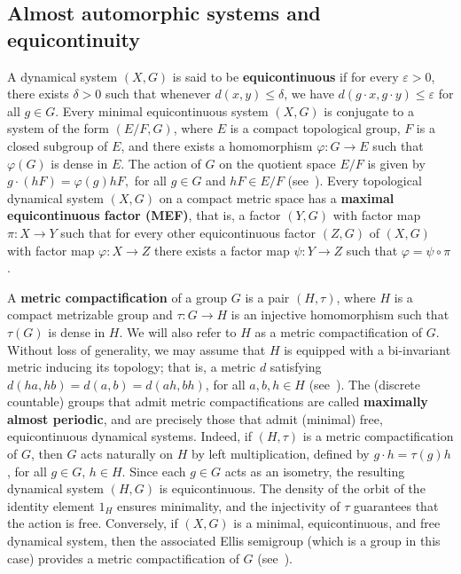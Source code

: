 \documentclass[titlepage,reqno,10pt]{amsart}
\theoremstyle{definition}
\begin{document}
\subsection{Almost automorphic systems and equicontinuity}\label{sec_equicontinuous} A dynamical system $(X, G)$ is said to be \textbf{equicontinuous} if for every $\varepsilon > 0$, there exists $\delta > 0$ such that whenever $d(x, y) \leq \delta$, we have $d(g \cdot x, g \cdot y) \leq \varepsilon$  for all  $g \in G.$ Every minimal equicontinuous system $(X, G)$ is conjugate to a system of the form $(E/F, G)$, where $E$ is a compact topological group, $F$ is a closed subgroup of $E$, and there exists a homomorphism $\varphi: G \to E$ such that $\varphi(G)$ is dense in $E$. The action of $G$ on the quotient space $E/F$ is given by
$g \cdot (hF) = \varphi(g) h F,$ for all  $g \in G$  and  $hF \in E/F$ (see~\cite[Theorem 3, Chapter 3]{Au88}). Every topological dynamical system $(X,G)$ on a compact metric space has a  \textbf{maximal equicontinuous factor (MEF)}, that is, a factor $(Y,G)$ with factor map $\pi:X\to Y$ such that for every other equicontinuous factor $(Z,G)$ of $(X,G)$ with factor map $\varphi:X\to Z$ there exists a factor map $\psi:Y\to Z$ such that $\varphi=\psi\circ \pi$ \cite{Au88,Do05}. 

A \textbf{metric compactification} of a group $G$ is a pair $(H, \tau)$, where $H$ is a compact metrizable group and $\tau: G \to H$ is an injective homomorphism such that $\tau(G)$ is dense in $H$. We will also refer to $H$ as a metric compactification of $G$. Without loss of generality, we may assume that $H$ is equipped with a bi-invariant metric inducing its topology; that is, a metric $d$ satisfying $d(ha, hb) = d(a, b) = d(ah, bh)$, for all  $a, b, h \in H$ (see~\cite[Proposition 8.43]{HofMo20}).
The (discrete countable) groups that admit metric compactifications are called \textbf{maximally almost periodic}, and are precisely those that admit (minimal) free, equicontinuous dynamical systems. Indeed, if $(H, \tau)$ is a metric compactification of $G$, then $G$ acts naturally on $H$ by left multiplication, defined by $g \cdot h = \tau(g)h$, for all $g \in G,\, h \in H$. Since each $g \in G$ acts as an isometry, the resulting dynamical system $(H, G)$ is equicontinuous. The density of the orbit of the identity element $1_H$ ensures minimality, and the injectivity of $\tau$ guarantees that the action is free. Conversely, if $(X, G)$ is a minimal, equicontinuous, and free dynamical system, then the associated Ellis semigroup (which is a group in this case) provides a metric compactification of $G$ (see~\cite{Au88}).
\end{document}
